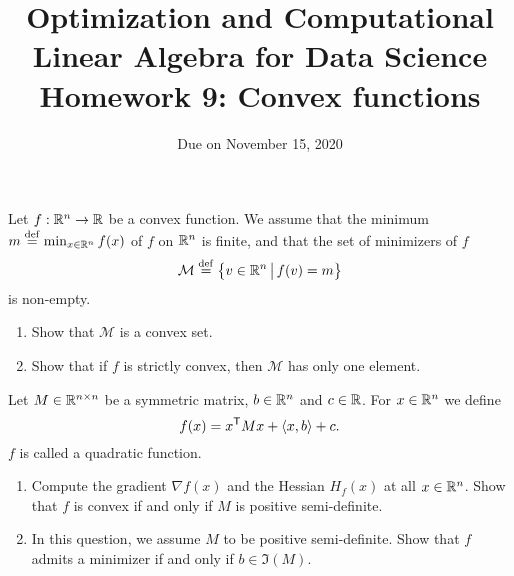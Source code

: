 \documentclass[11pt,nocut]{article}
\title{\vspace{-2.0cm}%
	Optimization and Computational Linear Algebra for Data Science\\
Homework 9: Convex functions}
\date{\vspace{-1cm}Due on November 15, 2020}
\begin{document}
\maketitle



\vspace{4mm}

\begin{problem}[2 points]
	Let $f: \mathbb{R}^n \to \mathbb{R}$ be a convex function. We assume that the minimum $m \overset{\rm def}{=} \min_{x \in \mathbb{R}^n} f(x)$ of $f$ on $\mathbb{R}^n$ is finite, and that the set of minimizers of $f$
$$
\mathcal{M} \overset{\rm def}{=} \big\{ v \in \mathbb{R}^n \, \big| \, f(v) = m \big\}
$$
is non-empty.

	\begin{enumerate}[label=\normalfont(\textbf{\alph*})]
		\item Show that $\mathcal{M}$ is a convex set.
		\item Show that if $f$ is strictly convex, then $\mathcal{M}$ has only one element.
	\end{enumerate}

\end{problem}

\vspace{4mm}

\begin{problem}[2 points]
	Let $M \in \mathbb{R}^{n \times n}$ be a symmetric matrix, $b \in \mathbb{R}^n$ and $c \in \mathbb{R}$.
	For $x \in \mathbb{R}^n$ we define
	$$
	f(x) = x^{{\sf T}} M x + \langle x,b \rangle + c.
	$$
	$f$ is called a quadratic function.
	\begin{enumerate}[label=\normalfont(\textbf{\alph*})]
		\item Compute the gradient $\nabla f(x)$ and the Hessian $H_f(x)$ at all $x \in \mathbb{R}^n$. Show that $f$ is convex if and only if $M$ is positive semi-definite.
		\item In this question, we assume $M$ to be positive semi-definite. Show that $f$ admits a minimizer if and only if $b \in \Im(M)$.
	\end{enumerate}
\end{problem}

\newpage
\end{document}
